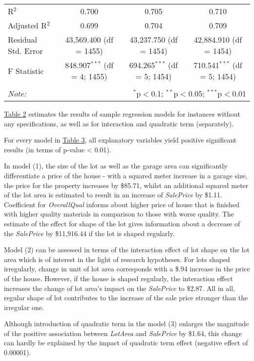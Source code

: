 \documentclass{article}
\begin{document}
\begin{table}[h]
\begin{tabular}{@{\extracolsep{5pt}}lccc}
R$^{2}$ & 0.700 & 0.705 & 0.710 \\ 
Adjusted R$^{2}$ & 0.699 & 0.704 & 0.709 \\ 
Residual Std. Error & 43,569.400 (df = 1455) & 43,237.750 (df = 1454) & 42,884.910 (df = 1454) \\ 
F Statistic & 848.907$^{***}$ (df = 4; 1455) & 694.265$^{***}$ (df = 5; 1454) & 710.541$^{***}$ (df = 5; 1454) \\ 
\hline 
\hline \\[-1.8ex] 
\textit{Note:}  & \multicolumn{3}{r}{$^{*}$p$<$0.1; $^{**}$p$<$0.05; $^{***}$p$<$0.01} \\ 
\end{tabular} 
\end{table} 

\hyperref[tab:sampleregression]{Table 2} estimates the results of sample regression models for instances without any specifications, as well as for interaction and quadratic term (separately). 

For every model in \hyperref[tab:sampleregression]{Table 3}, all explanatory variables yield positive significant results (in terms of p-value < 0.01). 

In model (1), the size of the lot as well as the garage area can significantly differentiate a price of the house - with a squared meter increase in a garage size, the price for the property increases by \$85.71, whilst an additional squared meter of the lot area is estimated to result in an increase of \emph{SalePrice} by \$1.11. Coefficient for \emph{OverallQual} informs about higher price of house that is finished with higher quality materials in comparison to those with worse quality. The estimate of the effect for shape of the lot gives information about a decrease of the \emph{SalePrice} by \$11,916.44 if the lot is shaped regularly. 

Model (2) can be assessed in terms of the interaction effect of lot shape on the lot area which is of interest in the light of research hypotheses. For lots shaped irregularly, change in unit of lot area corresponds with a \$.94 increase in the price of the house. However, if the house is shaped regularly, the interaction effect increases the change of lot area's impact on the \emph{SalePrice} to \$2.87. All in all, regular shape of lot contributes to the increase of the sale price stronger than the irregular one.

Although introduction of quadratic term in the model (3) enlarges the magnitude of the positive association between \emph{LotArea} and \emph{SalePrice} by \$1.64, this change can hardly be explained by the impact of quadratic term effect (negative effect of 0.00001).
\end{document}
